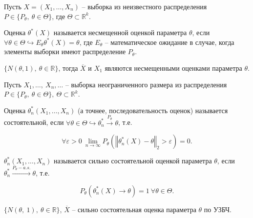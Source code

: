 Пусть $\displaystyle X=( X_{1} ,\dotsc ,X_{n})$ -- выборка из неизвестного распределения $\displaystyle P\in \{P_{\theta },\ \theta \in \Theta \}$, где $\displaystyle \Theta \subset \mathbb{R}^{k}$.
\begin{definition}
Оценка $\displaystyle \theta ^{*}( X)$ называется несмещенной оценкой параметра $\displaystyle \theta $, если $\displaystyle \forall \theta \in \Theta \hookrightarrow E_{\theta } \theta ^{*}( X) =\theta $, где $\displaystyle E_{\theta }$ -- математическое ожидание в случае, когда элементы выборки имеют распределение $\displaystyle P_{\theta }$.
\end{definition}
\begin{example}
$\displaystyle \{N( \theta ,1),\ \theta \in \mathbb{R}\}$, тогда $\displaystyle \overline{X}$ и $\displaystyle X_{1}$ являются несмещенными оценками параметра $\displaystyle \theta $.
\end{example}
Пусть $\displaystyle X_{1}, \dotsc,\ X_{n},\dotsc $ -- выборка неограниченного размера из распределения $\displaystyle P\in \{P_{\theta },\ \theta \in \Theta \},\ \Theta \subset \mathbb{R}^{k}$.
\begin{definition}
Оценка $\displaystyle \theta _{n}^{*}( X_{1} ,\dotsc ,X_{n})$ (а точнее, последовательность оценок) называется состоятельной, если $\displaystyle \forall \theta \in \Theta \hookrightarrow \theta _{n}^{*}\xrightarrow{P_{\theta }} \theta $, т.е.


\begin{equation*}
\forall \varepsilon  >0\ \lim _{n\rightarrow \infty } P_{\theta }\left(\left\Vert \theta _{n}^{*}( X) -\theta \right\Vert _{2}  >\varepsilon \right) =0.
\end{equation*}
\end{definition}
\begin{definition}
$\displaystyle \theta _{n}^{*}( X_{1} ,\dotsc ,X_{n})$ называется сильно состоятельной оценкой параметра $\displaystyle \theta $, если $\displaystyle \theta _{n}^{*}\xrightarrow{P_{\theta } -a.s.} \theta $, т.е.


\begin{equation*}
P_{\theta }\left( \theta _{n}^{*}( X)\rightarrow \theta \right) =1\ \forall \theta \in \Theta .
\end{equation*}
\end{definition}
\begin{example}
$\displaystyle \{N( \theta,\ 1),\ \theta \in \mathbb{R}\}$, $\displaystyle \overline{X}$ -- сильно состоятельная оценка параметра $\displaystyle \theta $ по УЗБЧ.
\end{example}

